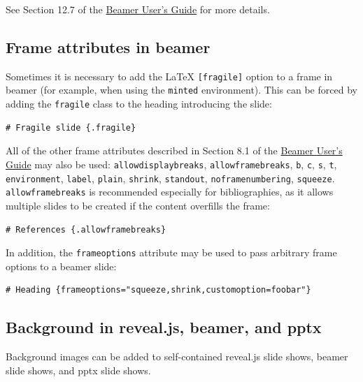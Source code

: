 \documentclass[
]{article}
\begin{document}
See Section 12.7 of the
\href{http://mirrors.ctan.org/macros/latex/contrib/beamer/doc/beameruserguide.pdf}{Beamer
User's Guide} for more details.

\hypertarget{frame-attributes-in-beamer}{%
\subsection{Frame attributes in
beamer}\label{frame-attributes-in-beamer}}

Sometimes it is necessary to add the LaTeX \texttt{{[}fragile{]}} option
to a frame in beamer (for example, when using the \texttt{minted}
environment). This can be forced by adding the \texttt{fragile} class to
the heading introducing the slide:

\begin{verbatim}
# Fragile slide {.fragile}
\end{verbatim}

All of the other frame attributes described in Section 8.1 of the
\href{http://mirrors.ctan.org/macros/latex/contrib/beamer/doc/beameruserguide.pdf}{Beamer
User's Guide} may also be used: \texttt{allowdisplaybreaks},
\texttt{allowframebreaks}, \texttt{b}, \texttt{c}, \texttt{s},
\texttt{t}, \texttt{environment}, \texttt{label}, \texttt{plain},
\texttt{shrink}, \texttt{standout}, \texttt{noframenumbering},
\texttt{squeeze}. \texttt{allowframebreaks} is recommended especially
for bibliographies, as it allows multiple slides to be created if the
content overfills the frame:

\begin{verbatim}
# References {.allowframebreaks}
\end{verbatim}

In addition, the \texttt{frameoptions} attribute may be used to pass
arbitrary frame options to a beamer slide:

\begin{verbatim}
# Heading {frameoptions="squeeze,shrink,customoption=foobar"}
\end{verbatim}

\hypertarget{background-in-reveal.js-beamer-and-pptx}{%
\subsection{Background in reveal.js, beamer, and
pptx}\label{background-in-reveal.js-beamer-and-pptx}}

Background images can be added to self-contained reveal.js slide shows,
beamer slide shows, and pptx slide shows.
\end{document}
